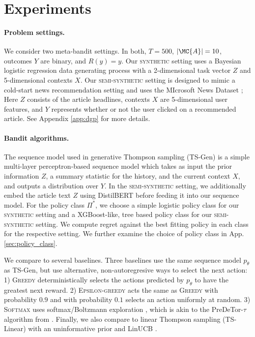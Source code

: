 \section{Experiments}
\label{sec:experiments}

\paragraph{Problem settings.} We consider two meta-bandit settings. In both, $T=500$, $|\MC{A}| = 10$, outcomes $Y$ are binary, and $R(y) = y$. Our \textsc{synthetic} setting uses a Bayesian logistic regression data generating process with a 2-dimensional task vector $Z$ and 5-dimensional contexts $X$. Our \textsc{semi-synthetic} setting is designed to mimic a cold-start news recommendation setting and uses the MIcrosoft News Dataset \citep{wu2020mind}; Here $Z$ consists of the article headlines, contexts $X$ are 5-dimensional user features, and $Y$ represents whether or not the user clicked on a recommended article. See Appendix \ref{app:dgp} for more details.

\paragraph{Bandit algorithms.}
The sequence model used in generative Thompson sampling (TS-Gen) is a simple multi-layer perceptron-based sequence model which takes as input the prior information $Z$, a summary statistic for the history, and the current context $X$, and outputs a distribution over $Y$. In the \textsc{semi-synthetic} setting, we additionally embed the article text $Z$ using DistilBERT \citep{sanh2019distilbert} before feeding it into our sequence model. For the policy class $\Pi^*$, we choose a simple logistic policy class for our \textsc{synthetic} setting and a XGBoost-like, tree based policy class for our \textsc{semi-synthetic} setting. We compute regret against the best fitting policy in each class for the respective setting. We further examine the choice of policy class in App. \ref{sec:policy_class}.

We compare to several baselines. Three baselines use the same sequence model $p_\theta$ as TS-Gen, but use alternative, non-autoregresive ways to select the next action: 1) \textsc{Greedy} deterministically selects the actions predicted by $p_\theta$ to have the greatest next reward. 2) \textsc{Epsilon-greedy} acts the same as \textsc{Greedy} with probability $0.9$ and with probability $0.1$ selects an action uniformly at random. 3) \textsc{Softmax} uses softmax/Boltzmann exploration \citep{cesa2017boltzmann}, which is akin to the PreDeTor-$\tau$ algorithm from \citet{predetor}. 
Finally, we also compare to linear Thompson sampling (TS-Linear) with an uninformative prior \citep{agrawal2013thompson} and LinUCB \citep{li2010contextual}.

